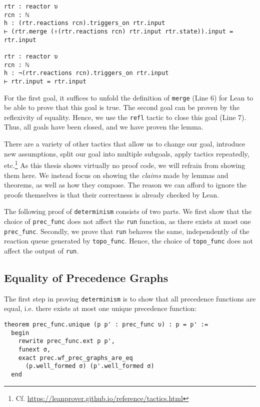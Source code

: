 \begin{lstlisting}
rtr : reactor υ
rcn : ℕ
h : (rtr.reactions rcn).triggers_on rtr.input
⊢ (rtr.merge (⇑(rtr.reactions rcn) rtr.input rtr.state)).input = rtr.input

rtr : reactor υ
rcn : ℕ
h : ¬(rtr.reactions rcn).triggers_on rtr.input
⊢ rtr.input = rtr.input
\end{lstlisting}

\noindent For the first goal, it suffices to unfold the definition of \lstinline{merge} (Line 6) for Lean to be able to prove that this goal is true.
The second goal can be proven by the reflexivity of equality.
Hence, we use the \lstinline{refl} tactic to close this goal (Line 7).
Thus, all goals have been closed, and we have proven the lemma.

There are a variety of other tactics that allow us to change our goal, introduce new assumptions, split our goal into multiple subgoals, apply tactics repeatedly, etc.\footnote{
  Cf. \url{https://leanprover.github.io/reference/tactics.html}
}
As this thesis shows virtually no proof code, we will refrain from showing them here.
We instead focus on showing the \emph{claims} made by lemmas and theorems, as well as how they compose.
The reason we can afford to ignore the proofs themselves is that their correctness is already checked by Lean.

The following proof of \lstinline{determinism} consists of two parts. 
We first show that the choice of \lstinline{prec_func} does not affect the \lstinline{run} function, as there exists at most one \lstinline{prec_func}.
Secondly, we prove that \lstinline{run} behaves the same, independently of the reaction queue generated by \lstinline{topo_func}.
Hence, the choice of \lstinline{topo_func} does not affect the output of \lstinline{run}.

\break

\subsection{Equality of Precedence Graphs}
\label{section:unique-prec-graph}

The first step in proving \lstinline{determinism} is to show that all precedence functions are equal, i.e. there exists at most one unique precedence function:

\lstset{numbers=left, xleftmargin=1.5em}
\begin{lstlisting}
theorem prec_func.unique (p p' : prec_func υ) : p = p' :=
  begin
    rewrite prec_func.ext p p',
    funext σ,
    exact prec.wf_prec_graphs_are_eq 
      (p.well_formed σ) (p'.well_formed σ)
  end
\end{lstlisting}
\lstset{numbers=none, xleftmargin=0em}

